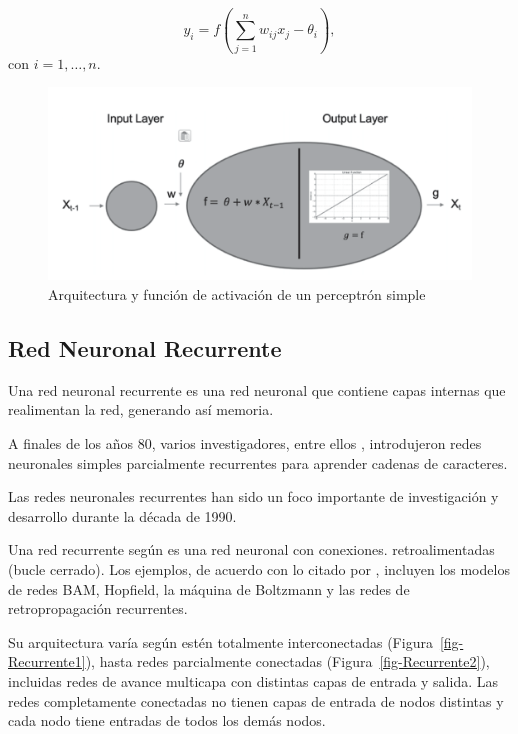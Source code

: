 \documentclass[
  us-letterpaper,
]{scrreprt}
\theoremstyle{plain}
\theoremstyle{definition}
\theoremstyle{definition}
\theoremstyle{remark}
\begin{document}
\[ y_i = f \left(  \sum_{j=1}^{n}  w_{ij} x_j - \theta_i \right) ,\] con
\(i=1, \dots , n .\)

\begin{figure}[H]

{\centering \includegraphics[width=5.85417in,height=\textheight,keepaspectratio]{perceptron.png}

}

\caption{Arquitectura y función de activación de un perceptrón simple}

\end{figure}%

\subsection{Red Neuronal Recurrente}\label{red-neuronal-recurrente}

Una red neuronal recurrente es una red neuronal que contiene capas
internas que realimentan la red, generando así memoria.

A finales de los años 80, varios investigadores, entre ellos
\textcite{rumelhart1986learning}, introdujeron redes neuronales simples
parcialmente recurrentes para aprender cadenas de caracteres.

Las redes neuronales recurrentes han sido un foco importante de
investigación y desarrollo durante la década de 1990.

Una red recurrente según \textcite{da1996fundamentals} es una red
neuronal con conexiones. retroalimentadas (bucle cerrado). Los ejemplos,
de acuerdo con lo citado por \textcite{hecht1990neurocomputing},
incluyen los modelos de redes BAM, Hopfield, la máquina de Boltzmann y
las redes de retropropagación recurrentes.

Su arquitectura varía según estén totalmente interconectadas
(Figura~\ref{fig-Recurrente1}), hasta redes parcialmente conectadas
(Figura~\ref{fig-Recurrente2}), incluidas redes de avance multicapa con
distintas capas de entrada y salida. Las redes completamente conectadas
no tienen capas de entrada de nodos distintas y cada nodo tiene entradas
de todos los demás nodos.
\end{document}
